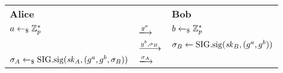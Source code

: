 \begin{tabular}{lC{3cm}l}
    \textbf{Alice} &  & \textbf{Bob}\\
    $a\gets_\$\mathbb{Z}_p^*$ & $\xlongrightarrow{g^a}$ & $b\gets_\$\mathbb{Z}_p^*$ \\
     & $\xlongrightarrow{g^b,\sigma_B}$ & $\sigma_B\gets\mathrm{SIG}.\mathrm{sig}(\mathit{sk}_B,(g^a, g^b))$ \\
     $\sigma_A\gets_\$\mathrm{SIG}.\mathrm{sig}(\mathit{sk}_A,(g^a, g^b, \sigma_B))$ & $\xlongrightarrow{\sigma_A}$ & \\
\end{tabular}